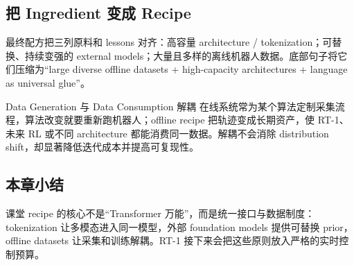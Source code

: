 \subsection{把 Ingredient 变成 Recipe}

最终配方把三列原料和 lessons 对齐：高容量 architecture / tokenization；可替换、持续变强的 external models；大量且多样的离线机器人数据。底部句子将它们压缩为“large diverse offline datasets + high-capacity architectures + language as universal glue”。


\begin{importantbox}{Data Generation 与 Data Consumption 解耦}
在线系统常为某个算法定制采集流程，算法改变就要重新跑机器人；offline recipe 把轨迹变成长期资产，使 RT-1、未来 RL 或不同 architecture 都能消费同一数据。解耦不会消除 distribution shift，却显著降低迭代成本并提高可复现性。
\end{importantbox}

\subsection{本章小结}

课堂 recipe 的核心不是“Transformer 万能”，而是统一接口与数据制度：tokenization 让多模态进入同一模型，外部 foundation models 提供可替换 prior，offline datasets 让采集和训练解耦。RT-1 接下来会把这些原则放入严格的实时控制预算。

